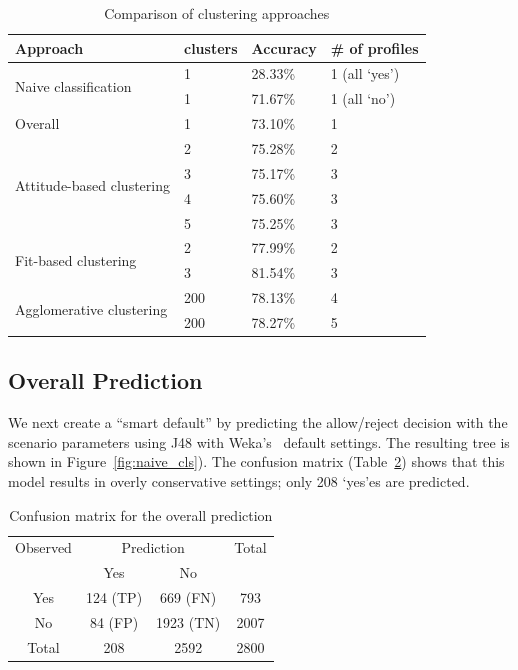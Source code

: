 \begin{table}
	\centering
	\caption{Comparison of clustering approaches}
	\label{tab:comp_approach}
	\begin{tabular}{  l |  l |  l | l}
		\hline
		Approach & clusters & Accuracy & \# of profiles \\ \hline
		\multirow{2}{6em}{Naive classification} & 1 & 28.33\% & 1  (all `yes')\\ %
		& 1 & 71.67\% & 1 (all `no') \\ \hline
		Overall & 1 & 73.10\% & 1 \\ \hline 
		\multirow{4}{6em}{Attitude-based clustering} & 2 & 75.28\% & 2 \\ %
		& 3 & 75.17\% & 3 \\ %
		& 4 & 75.60\% & 3 \\ %
		& 5 & 75.25\% & 3 \\ \hline
		\multirow{2}{6em}{Fit-based clustering} & 2 & 77.99\% & 2 \\ %
		& 3 & 81.54\% & 3 \\ \hline
		\multirow{2}{6em}{Agglomerative  clustering} & 200 & 78.13\% & 4 \\ %
		& 200 & 78.27\% & 5 \\ \hline %
	\end{tabular}
\end{table}

\subsection{Overall Prediction}
We next create a ``smart default'' by predicting the allow/reject decision with the scenario parameters using J48 with Weka's~\cite{hall2009weka} default settings. The resulting tree is shown in Figure~\ref{fig:naive_cls}). The confusion matrix (Table~\ref{tab:confusion_matrix}) shows that this model results in overly conservative settings; only 208 `yes'es are predicted.

\begin{table}
	\centering
	\caption{Confusion matrix for the overall prediction}
	\label{tab:confusion_matrix}
	\begin{tabular}{c|c|c|c} \hline
		Observed &\multicolumn{2}{c|}{Prediction} & Total\\ \cline{2-3}
		& Yes     & No       &  \\ \hline
		Yes   & 124 (TP) & 669 (FN)  & 793   \\ \hline
		No    & 84 (FP)  & 1923 (TN) & 2007  \\ \hline
		Total & 208     & 2592     & 2800  \\ \hline
	\end{tabular}
\end{table}

